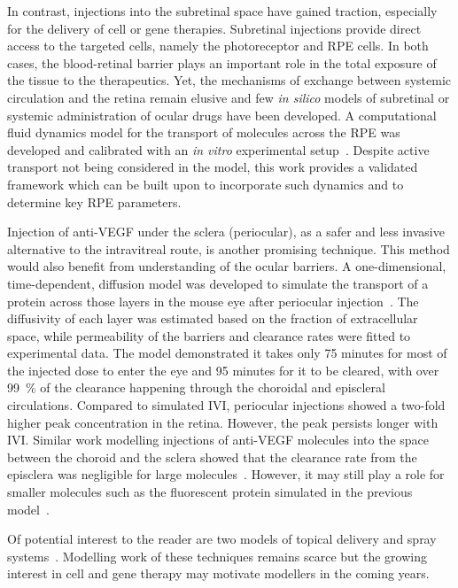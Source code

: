 \documentclass{article}
\begin{document}
In contrast, injections into the subretinal space have gained traction, especially for the delivery of cell or gene therapies.
Subretinal injections provide direct access to the targeted cells, namely the photoreceptor and RPE cells.
In both cases, the blood-retinal barrier plays an important role in the total exposure of the tissue to the therapeutics.
Yet, the mechanisms of exchange between systemic circulation and the retina remain elusive and few \textit{in silico} models of subretinal or systemic administration of ocular drugs have been developed.
A computational fluid dynamics model for the transport of molecules across the RPE was developed and calibrated with an \textit{in vitro} experimental setup~\cite{Davies_2020}.
Despite active transport not being considered in the model, this work provides a validated framework which can be built upon to incorporate such dynamics and to determine key RPE parameters.

Injection of anti-VEGF under the sclera (periocular), as a safer and less invasive alternative to the intravitreal route, is another promising technique.
This method would also benefit from understanding of the ocular barriers.
A one-dimensional, time-dependent, diffusion model was developed to simulate the transport of a protein across those layers in the mouse eye after periocular injection~\cite{Gabhann_2007}.
The diffusivity of each layer was estimated based on the fraction of extracellular space, while permeability of the barriers and clearance rates were fitted to experimental data.
The model demonstrated it takes only 75 minutes for most of the injected dose to enter the eye and 95 minutes for it to be cleared, with over \SI{99}{\percent} of the clearance happening through the choroidal and episcleral circulations.
Compared to simulated IVI, periocular injections showed a two-fold higher peak concentration in the retina.
However, the peak persists longer with IVI.
Similar work modelling injections of anti-VEGF molecules into the space between the choroid and the sclera showed that the clearance rate from the episclera was negligible for large molecules~\cite{Zhang_2018}.
However, it may still play a role for smaller molecules such as the fluorescent protein simulated in the previous model~\cite{Gabhann_2007}.

Of potential interest to the reader are two models of topical delivery and spray systems~\cite{Mori_2017,Nweze_2020}.
Modelling work of these techniques remains scarce but the growing interest in cell and gene therapy may motivate modellers in the coming years.
\end{document}
